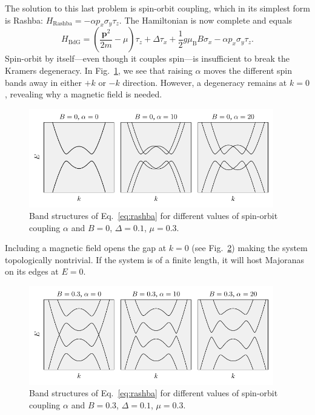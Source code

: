 The solution to this last problem is spin-orbit coupling, which in its simplest form is Rashba: $H_{\textrm{Rashba}}=-\alpha p_{x}\sigma_{y}\tau_{z}$.
The Hamiltonian is now complete and equals
\begin{equation}
H_{\textrm{BdG}}=\left(\frac{\bm{p}^{2}}{2m}-\mu\right)\tau_{z}+\Delta\tau_{x}+\frac{1}{2}g\mu_{\textrm{B}}B\sigma_{x}-\alpha p_{x}\sigma_{y}\tau_{z}.\label{eq:rashba}
\end{equation}
Spin-orbit by itself---even though it couples spin---is insufficient to break the Kramers degeneracy.
In Fig.~\ref{fig:SO_no_zeeman}, we see that raising $\alpha$ moves the different spin bands away in either $+k$ or $-k$ direction.
However, a degeneracy remains at $k=0$, revealing why a magnetic field is needed.
\begin{figure}
\begin{center}
\includegraphics[width=0.95\textwidth]{chapter_introduction/figures/SO_no_zeeman.pdf}
\caption{Band structures of Eq.~\eqref{eq:rashba} for different values of spin-orbit coupling $\alpha$ and $B=0$, $\Delta=0.1$, $\mu=0.3$.
\label{fig:SO_no_zeeman}}
\end{center}
\end{figure}
Including a magnetic field opens the gap at $k=0$ (see Fig.~\ref{fig:SO_and_zeeman}) making the system topologically nontrivial.
If the system is of a finite length, it will host Majoranas on its edges at $E=0$.
\begin{figure}
\begin{center}
\includegraphics[width=0.95\textwidth]{chapter_introduction/figures/SO_and_zeeman.pdf}
\caption{Band structures of Eq.~\eqref{eq:rashba} for different values of spin-orbit coupling $\alpha$ and $B=0.3$, $\Delta=0.1$, $\mu=0.3$.
\label{fig:SO_and_zeeman}}
\end{center}
\end{figure}

